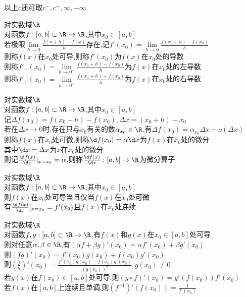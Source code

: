 \begin{zhu}
以上$c$还可取$c^{-},c^{+},\infty,-\infty$
\end{zhu}

\begin{dingyi}
对实数域$\R$\\
对函数$f:[a,b]\subset \R \to \R$,其中$x_0\in [a,b]$\\
若极限$\lim\limits_{h\to 0}\frac{f(x+h)-f(x)}{h}$存在,记$f'(x_0)=\lim\limits_{h\to 0}\frac{f(x_0+h)-f(x_0)}{h}$\\
则称$f(x)$在$x_0$处可导,则称$f'(x_0)$为$f(x)$在$x_0$处的导数\\
则称$f'_{-}(x_0)=\lim\limits_{h\to 0^{-}}\frac{f(x_0+h)-f(x_0)}{h}$为$f(x)$在$x_0$处的左导数\\
则称$f'_{+}(x_0)=\lim\limits_{h\to 0^{+}}\frac{f(x_0+h)-f(x_0)}{h}$为$f(x)$在$x_0$处的右导数
\end{dingyi}

\begin{dingyi}
对实数域$\R$\\
对函数$f:[a,b]\subset \R \to \R$,其中$x_0\in [a,b]$\\
记$\Delta f(x_0)=f(x_0+h)-f(x_0),\Delta x=(x_0+h)-x_0$\\
若在$\Delta x\to 0$时,存在只与$x_0$有关的数$\alpha_{x_0}\in\R$,有$\Delta f(x_0)=\alpha_{x_0} \Delta x+o(\Delta x)$\\
则称$f(x)$在$x_0$处可微,则称$\d f(x_0)=\alpha \d x$为$f(x)$在$x_0$处的微分\\
其中$\d x=\Delta x$为$x$在$x_0$处的微分\\
则记$\frac{\d f(x)}{\d x}|_{x=x_0}=\alpha$,则称$\frac{\d f(x)}{\d x}:[a,b]\to \R$为微分算子
\end{dingyi}

\begin{dingli}
对实数域$\R$\\
对函数$f:[a,b]\subset \R \to \R$,其中$x_0\in [a,b]$\\
则$f(x)$在$x_0$处可导当且仅当$f(x)$在$x_0$处可微\\
有$\frac{\d f(x)}{\d x}|_{x=x_0}=f'(x_0)$且$f(x)$在$x_0$处连续
\end{dingli}

\begin{dingli}
对实数域$\R$\\
对函数$f,g:[a,b]\subset \R \to \R$,有$f(x)$和$g(x)$在$x_0\in [a,b]$处可导\\
则对任意$\alpha,\beta\in\R$,有$(\alpha f+\beta g)'(x_0)=\alpha f'(x_0)+\beta g'(x_0)$\\
则$(fg)'(x_0)=f'(x_0)g(x_0)+f(x_0)g'(x_0)$\\
则$(\frac{f}{g})'(x_0)=\frac{f'(x_0)g(x_0)-f(x_0)g'(x_0)}{(g(x_0))^2},g(x_0)\neq 0$\\
若$g(x)$在$f(x_0)\in [a,b]$处可导,则$(g\circ f)'(x_0)=g'(f(x_0))f'(x_0)$\\
若$f(x)$在$[a,b]$上连续且单调,则$(f^{-1})'(f(x_0))=\frac{1}{f'(x_0)}$
\end{dingli}

